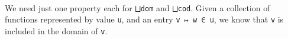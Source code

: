 \begin{fence}
\begin{code}%
\>[0]\AgdaSpace{}%
\AgdaSymbol{:}\AgdaSpace{}%
\AgdaSymbol{(}\AgdaSpace{}%
\AgdaSymbol{:}\AgdaSpace{}%
\AgdaSymbol{)}\AgdaSpace{}%
\AgdaSpace{}%
\<%
\\
\>[0]\AgdaSpace{}%
%
\>[8]\AgdaSymbol{=}\AgdaSpace{}%
\<%
\\
\>[0]\AgdaSpace{}%
\AgdaSymbol{(}\AgdaSpace{}%
\AgdaSpace{}%
\AgdaSymbol{)}\AgdaSpace{}%
\AgdaSymbol{=}\AgdaSpace{}%
\<%
\\
\>[0]\AgdaSpace{}%
\AgdaSymbol{(}\AgdaSpace{}%
\AgdaSpace{}%
\AgdaSymbol{)}\AgdaSpace{}%
\AgdaSymbol{=}\AgdaSpace{}%
\AgdaSpace{}%
\AgdaSpace{}%
\AgdaSpace{}%
\AgdaSpace{}%
\<%
\\
%
\\[\AgdaEmptyExtraSkip]%
\>[0]\AgdaSpace{}%
\AgdaSymbol{:}\AgdaSpace{}%
\AgdaSymbol{(}\AgdaSpace{}%
\AgdaSymbol{:}\AgdaSpace{}%
\AgdaSymbol{)}\AgdaSpace{}%
\AgdaSpace{}%
\<%
\\
\>[0]\AgdaSpace{}%
%
\>[8]\AgdaSymbol{=}\AgdaSpace{}%
\<%
\\
\>[0]\AgdaSpace{}%
\AgdaSymbol{(}\AgdaSpace{}%
\AgdaSpace{}%
\AgdaSymbol{)}\AgdaSpace{}%
\AgdaSymbol{=}\AgdaSpace{}%
\<%
\\
\>[0]\AgdaSpace{}%
\AgdaSymbol{(}\AgdaSpace{}%
\AgdaSpace{}%
\AgdaSymbol{)}\AgdaSpace{}%
\AgdaSymbol{=}\AgdaSpace{}%
\AgdaSpace{}%
\AgdaSpace{}%
\AgdaSpace{}%
\AgdaSpace{}%
\<%
\end{code}
\end{fence}

We need just one property each for \texttt{⨆dom} and \texttt{⨆cod}.
Given a collection of functions represented by value \texttt{u}, and an
entry \texttt{v\ ↦\ w\ ∈\ u}, we know that \texttt{v} is included in the
domain of \texttt{v}.

